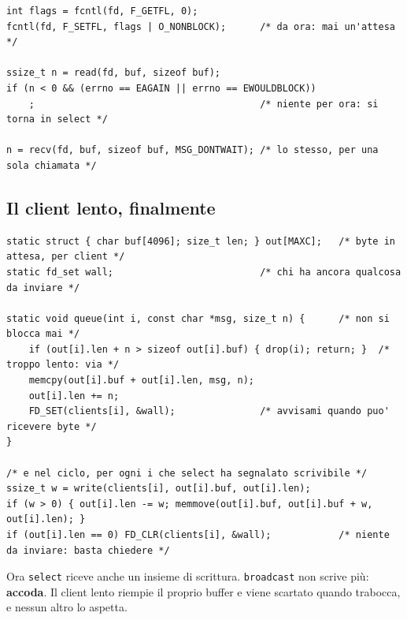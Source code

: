 \begin{lstlisting}[language={[POSIX]C}, style=wnumbers, title={Un descriptor non bloccante}]
int flags = fcntl(fd, F_GETFL, 0);
fcntl(fd, F_SETFL, flags | O_NONBLOCK);      /* da ora: mai un'attesa */

ssize_t n = read(fd, buf, sizeof buf);
if (n < 0 && (errno == EAGAIN || errno == EWOULDBLOCK))
    ;                                        /* niente per ora: si torna in select */

n = recv(fd, buf, sizeof buf, MSG_DONTWAIT); /* lo stesso, per una sola chiamata */
\end{lstlisting}

\subsection{Il client lento, finalmente}

\begin{lstlisting}[language={[POSIX]C}, style=wnumbers, title={Una coda in uscita per client}]
static struct { char buf[4096]; size_t len; } out[MAXC];   /* byte in attesa, per client */
static fd_set wall;                          /* chi ha ancora qualcosa da inviare */

static void queue(int i, const char *msg, size_t n) {      /* non si blocca mai */
    if (out[i].len + n > sizeof out[i].buf) { drop(i); return; }  /* troppo lento: via */
    memcpy(out[i].buf + out[i].len, msg, n);
    out[i].len += n;
    FD_SET(clients[i], &wall);               /* avvisami quando puo' ricevere byte */
}

/* e nel ciclo, per ogni i che select ha segnalato scrivibile */
ssize_t w = write(clients[i], out[i].buf, out[i].len);
if (w > 0) { out[i].len -= w; memmove(out[i].buf, out[i].buf + w, out[i].len); }
if (out[i].len == 0) FD_CLR(clients[i], &wall);            /* niente da inviare: basta chiedere */
\end{lstlisting}

Ora \texttt{select} riceve anche un insieme di scrittura. \texttt{broadcast} non scrive più: \textbf{accoda}. Il client
lento riempie il proprio buffer e viene scartato quando trabocca, e nessun altro lo aspetta.


